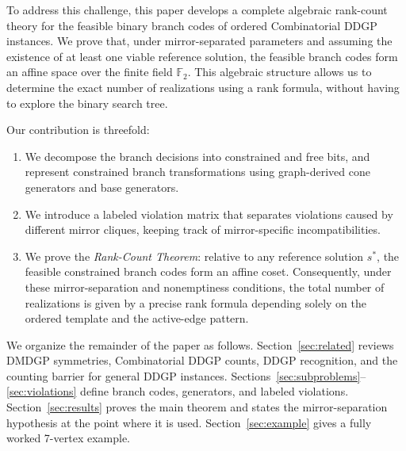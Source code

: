 To address this challenge, this paper develops a complete algebraic rank-count theory for the feasible binary branch codes of ordered Combinatorial DDGP instances. We prove that, under mirror-separated parameters and assuming the existence of at least one viable reference solution, the feasible branch codes form an affine space over the finite field \(\mathbb{F}_2\). This algebraic structure allows us to determine the exact number of realizations using a rank formula, without having to explore the binary search tree.

Our contribution is threefold:
\begin{enumerate}
    \item We decompose the branch decisions into constrained and free bits, and represent constrained branch transformations using graph-derived cone generators and base generators.
    \item We introduce a labeled violation matrix that separates violations caused by different mirror cliques, keeping track of mirror-specific incompatibilities.
    \item We prove the \emph{Rank-Count Theorem}: relative to any reference solution $s^\ast$, the feasible constrained branch codes form an affine coset. Consequently, under these mirror-separation and nonemptiness conditions, the total number of realizations is given by a precise rank formula depending solely on the ordered template and the active-edge pattern.
\end{enumerate}

We organize the remainder of the paper as follows. Section~\ref{sec:related} reviews DMDGP symmetries, Combinatorial DDGP counts, DDGP recognition, and the counting barrier for general DDGP instances. Sections~\ref{sec:subproblems}--\ref{sec:violations} define branch codes, generators, and labeled violations. Section~\ref{sec:results} proves the main theorem and states the mirror-separation hypothesis at the point where it is used. Section~\ref{sec:example} gives a fully worked 7-vertex example.
